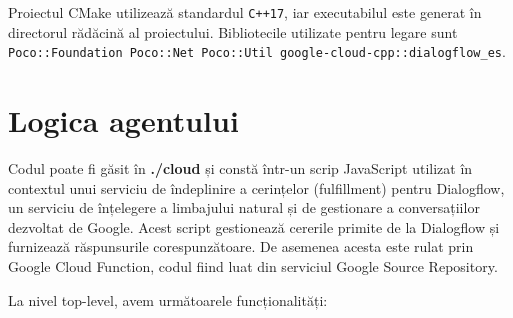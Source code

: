 Proiectul CMake utilizează standardul \texttt{C++17}, iar executabilul este generat în directorul rădăcină al proiectului. Bibliotecile utilizate pentru legare sunt \texttt{Poco::Foundation Poco::Net Poco::Util google-cloud-cpp::dialogflow\_es}.

\section{Logica agentului}

Codul poate fi găsit în \textbf{./cloud} și constă într-un scrip JavaScript utilizat în contextul unui serviciu de îndeplinire a cerințelor (fulfillment) pentru Dialogflow, un serviciu de înțelegere a limbajului natural și de gestionare a conversațiilor dezvoltat de Google. Acest script gestionează cererile primite de la Dialogflow și furnizează răspunsurile corespunzătoare. De asemenea acesta este rulat prin Google Cloud Function, codul fiind luat din serviciul Google Source Repository.

La nivel top-level, avem următoarele funcționalități:

